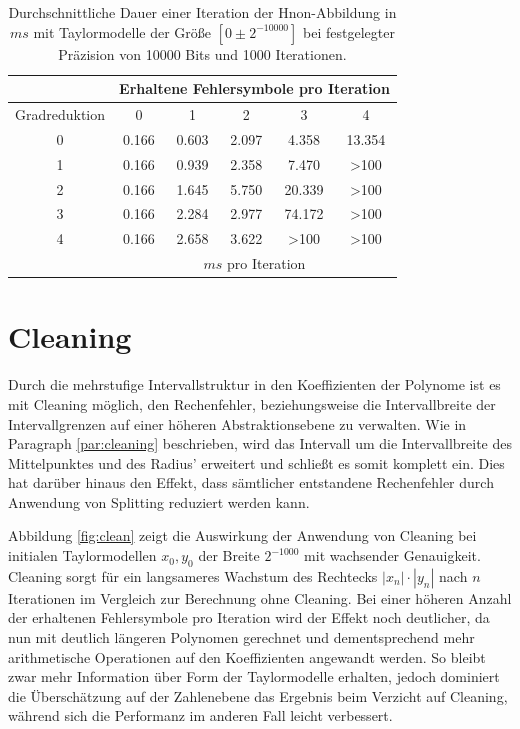   
 \begin{table}[tbh]
\centering
\begin{tabular}{|c||c|c|c|c|c|}
\hline
&\multicolumn{5}{c|}{Erhaltene Fehlersymbole pro Iteration} \\
\hline
Gradreduktion & 0 & 1 &2& 3 & 4\\
\hline
0& 0.166& 0.603&    2.097&   4.358&    13.354\\
1& 0.166& 0.939&   2.358&  7.470&   >100\\
2& 0.166& 1.645&     5.750&   20.339 &    >100\\
3& 0.166& 2.284&     2.977&   74.172&    >100\\
4&0.166& 2.658&    3.622&   >100    &   >100\\
\hline 
&\multicolumn{5}{c|}{$ms$ pro Iteration} \\
\hline
\end{tabular}

\caption[Experimentelle Ergebnisse zu erhaltenen Fehlersymbolen]{Durchschnittliche Dauer einer Iteration der H\e non-Abbildung in $ms$ mit Taylormodelle der Größe $[0\pm 2^{-10000}]$ bei festgelegter Präzision von 10000 Bits und 1000 Iterationen.}
\label{tab:time}
\end{table}
 
 
 \section{Cleaning}
 Durch die mehrstufige Intervallstruktur in den Koeffizienten der Polynome ist es mit Cleaning möglich, den Rechenfehler, beziehungsweise die Intervallbreite der Intervallgrenzen auf einer höheren Abstraktionsebene zu verwalten. Wie in Paragraph \ref{par:cleaning} beschrieben, wird das Intervall um die Intervallbreite des Mittelpunktes und des Radius' erweitert und schließt es somit komplett ein. Dies hat darüber hinaus den Effekt, dass sämtlicher entstandene Rechenfehler durch Anwendung von Splitting reduziert werden kann. 
 
 
 Abbildung \ref{fig:clean} zeigt die Auswirkung der Anwendung von Cleaning bei initialen Taylormodellen $x_0, y_0$ der Breite $2^{-1000}$ mit wachsender Genauigkeit. Cleaning sorgt für ein langsameres Wachstum des Rechtecks $|x_n|\cdot|y_n|$ nach $n$ Iterationen im Vergleich zur Berechnung ohne Cleaning. Bei einer höheren Anzahl der erhaltenen Fehlersymbole pro Iteration wird der Effekt noch deutlicher, da nun mit deutlich längeren Polynomen gerechnet und dementsprechend mehr arithmetische Operationen auf den Koeffizienten angewandt werden. So bleibt zwar mehr Information über Form der Taylormodelle erhalten, jedoch dominiert die Überschätzung auf der Zahlenebene das Ergebnis beim Verzicht auf Cleaning, während sich die Performanz im anderen Fall leicht verbessert.
 

